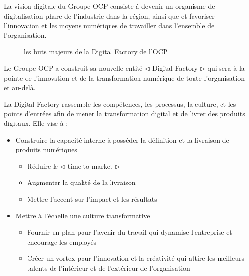 La vision digitale du Groupe OCP consiste \`a devenir un organisme de digitalisation phare de l'industrie dans la r\'egion, ainsi que et favoriser l'innovation et les moyens num\'eriques de travailler dans l'ensemble de l'organisation.

\begin{figure}[!htb]
	\caption{\label{fig:my-label} les buts majeurs de la Digital Factory de l'OCP}
\end{figure}

Le Groupe OCP a construit sa nouvelle entit\'e ${\triangleleft}$ Digital Factory ${\triangleright}$ qui sera \`a la pointe de l'innovation et de la transformation num\'erique de toute l'organisation et au-del\`a.

La Digital Factory rassemble les comp\'etences, les processus, la culture, et les points d'entr\'ees afin de mener la transformation digital et de livrer des produits digitaux. Elle vise \`a :

\begin{itemize}
\item Construire la capacit\'e interne \`a poss\'eder la d\'efinition et la livraison de produits num\'eriques
\begin{itemize}
\item R\'eduire le ${\triangleleft}$ time to market ${\triangleright}$
\item Augmenter la qualit\'e de la livraison
\item Mettre l'accent sur l'impact et les r\'esultats
\end{itemize}
\item Mettre \`a l'\'echelle une culture transformative
\begin{itemize}
\item Fournir un plan pour l'avenir du travail qui dynamise l'entreprise et encourage les employ\'es
\item Cr\'eer un vortex pour l'innovation et la cr\'eativit\'e qui attire les meilleurs talents de l'int\'erieur et de l'ext\'erieur de l'organisation
\end{itemize}
\end{itemize}

